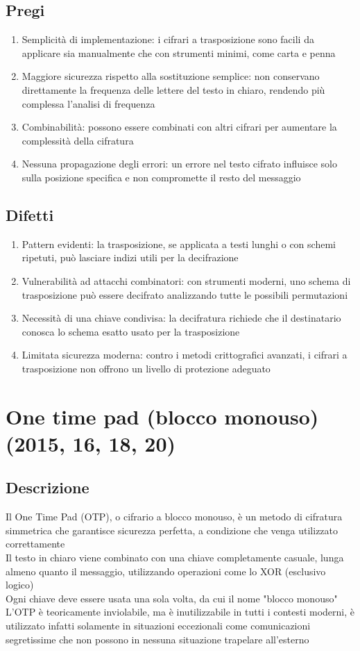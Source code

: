 \documentclass[10pt,oneside,a4paper]{article}
\begin{document}
\subsection{Pregi}
\begin{enumerate}
\item Semplicità di implementazione: i cifrari a trasposizione sono facili da applicare sia manualmente che con strumenti minimi, come carta e penna
\item Maggiore sicurezza rispetto alla sostituzione semplice: non conservano direttamente la frequenza delle lettere del testo in chiaro, rendendo più complessa l'analisi di frequenza
\item Combinabilità: possono essere combinati con altri cifrari per aumentare la complessità della cifratura
\item Nessuna propagazione degli errori: un errore nel testo cifrato influisce solo sulla posizione specifica e non compromette il resto del messaggio
\end{enumerate}
\subsection{Difetti}
\begin{enumerate}
\item Pattern evidenti: la trasposizione, se applicata a testi lunghi o con schemi ripetuti, può lasciare indizi utili per la decifrazione
\item Vulnerabilità ad attacchi combinatori: con strumenti moderni, uno schema di trasposizione può essere decifrato analizzando tutte le possibili permutazioni
\item Necessità di una chiave condivisa: la decifratura richiede che il destinatario conosca lo schema esatto usato per la trasposizione
\item Limitata sicurezza moderna: contro i metodi crittografici avanzati, i cifrari a trasposizione non offrono un livello di protezione adeguato
\end{enumerate}
\section{One time pad (blocco monouso) (2015, 16, 18, 20)}
\subsection{Descrizione}
Il One Time Pad (OTP), o cifrario a blocco monouso, è un metodo di cifratura simmetrica che garantisce sicurezza perfetta, a condizione che venga utilizzato correttamente\\
Il testo in chiaro viene combinato con una chiave completamente casuale, lunga almeno quanto il messaggio, utilizzando operazioni come lo XOR (esclusivo logico)\\
Ogni chiave deve essere usata una sola volta, da cui il nome "blocco monouso"\\  
L'OTP è teoricamente inviolabile, ma è inutilizzabile in tutti i contesti moderni, è utilizzato infatti solamente in situazioni eccezionali come comunicazioni segretissime che non possono in nessuna situazione trapelare all'esterno
\end{document}
